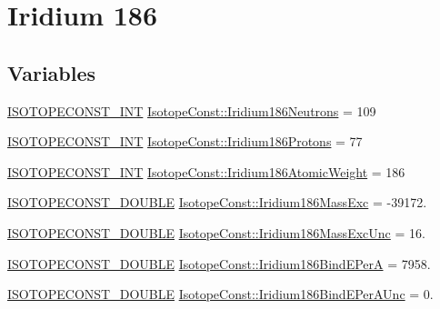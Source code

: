 \hypertarget{group___isotope_const-_iridium-_ir186}{}\section{Iridium 186}
\label{group___isotope_const-_iridium-_ir186}
\subsection*{Variables}
\begin{DoxyCompactItemize}
\item 
\mbox{\hyperlink{group___isotope_const-_macros_ga5f18360b3e99483a35c32d789e62621c}{I\+S\+O\+T\+O\+P\+E\+C\+O\+N\+S\+T\+\_\+\+I\+NT}} \mbox{\hyperlink{group___isotope_const-_iridium-_ir186_ga14e247f99cd406ff169791695e658669}{Isotope\+Const\+::\+Iridium186\+Neutrons}} = 109
\item 
\mbox{\hyperlink{group___isotope_const-_macros_ga5f18360b3e99483a35c32d789e62621c}{I\+S\+O\+T\+O\+P\+E\+C\+O\+N\+S\+T\+\_\+\+I\+NT}} \mbox{\hyperlink{group___isotope_const-_iridium-_ir186_ga5bdaa479e9a284ca22ebcd315188dd51}{Isotope\+Const\+::\+Iridium186\+Protons}} = 77
\item 
\mbox{\hyperlink{group___isotope_const-_macros_ga5f18360b3e99483a35c32d789e62621c}{I\+S\+O\+T\+O\+P\+E\+C\+O\+N\+S\+T\+\_\+\+I\+NT}} \mbox{\hyperlink{group___isotope_const-_iridium-_ir186_ga9c9423c977e6a657185536e40853b547}{Isotope\+Const\+::\+Iridium186\+Atomic\+Weight}} = 186
\item 
\mbox{\hyperlink{group___isotope_const-_macros_ga8f45a7272ce02c0b4c65c44636ed719a}{I\+S\+O\+T\+O\+P\+E\+C\+O\+N\+S\+T\+\_\+\+D\+O\+U\+B\+LE}} \mbox{\hyperlink{group___isotope_const-_iridium-_ir186_gac0c029ec1c933f4cca0c01bb3cd2abe4}{Isotope\+Const\+::\+Iridium186\+Mass\+Exc}} = -\/39172.
\item 
\mbox{\hyperlink{group___isotope_const-_macros_ga8f45a7272ce02c0b4c65c44636ed719a}{I\+S\+O\+T\+O\+P\+E\+C\+O\+N\+S\+T\+\_\+\+D\+O\+U\+B\+LE}} \mbox{\hyperlink{group___isotope_const-_iridium-_ir186_ga22e3c7007302d81a23cb159ffbbd41fa}{Isotope\+Const\+::\+Iridium186\+Mass\+Exc\+Unc}} = 16.
\item 
\mbox{\hyperlink{group___isotope_const-_macros_ga8f45a7272ce02c0b4c65c44636ed719a}{I\+S\+O\+T\+O\+P\+E\+C\+O\+N\+S\+T\+\_\+\+D\+O\+U\+B\+LE}} \mbox{\hyperlink{group___isotope_const-_iridium-_ir186_gafbbf209d076b0cbdefac9e1b708ad774}{Isotope\+Const\+::\+Iridium186\+Bind\+E\+PerA}} = 7958.
\item 
\mbox{\hyperlink{group___isotope_const-_macros_ga8f45a7272ce02c0b4c65c44636ed719a}{I\+S\+O\+T\+O\+P\+E\+C\+O\+N\+S\+T\+\_\+\+D\+O\+U\+B\+LE}} \mbox{\hyperlink{group___isotope_const-_iridium-_ir186_ga193227cdb60ed31e2224d6bf682c4ea2}{Isotope\+Const\+::\+Iridium186\+Bind\+E\+Per\+A\+Unc}} = 0.

\end{DoxyCompactItemize}

